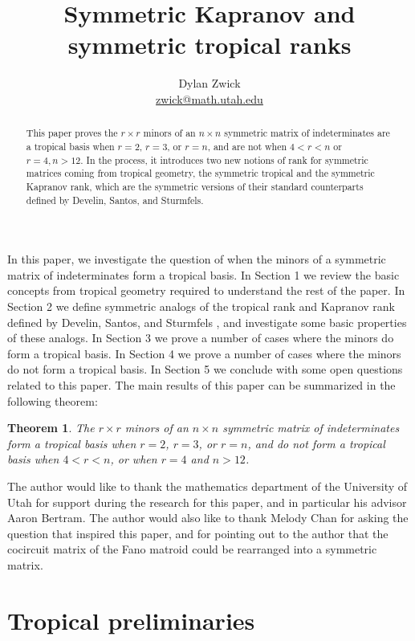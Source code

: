 \documentclass{article}
\title{Symmetric Kapranov and symmetric tropical ranks}
\author{Dylan Zwick \\ \href{mailto:zwick@math.utah.edu}{zwick@math.utah.edu}}
\date{}
\begin{document}
\maketitle

\begin{abstract} 
  This paper proves the $r \times r$ minors of an $n \times n$ symmetric matrix of indeterminates are a tropical basis when $r = 2$, $r = 3$, or $r = n$, and are not when $4 < r < n$ or $r = 4, n > 12$. In the process, it introduces two new notions of rank for symmetric matrices coming from tropical geometry, the symmetric tropical and the symmetric Kapranov rank, which are the symmetric versions of their standard counterparts defined by Develin, Santos, and Sturmfels.
\end{abstract}

In this paper, we investigate the question of when the minors of a symmetric matrix of indeterminates form a tropical basis. In Section 1 we review the basic concepts from tropical geometry required to understand the rest of the paper. In Section 2 we define symmetric analogs of the tropical rank and Kapranov rank defined by Develin, Santos, and Sturmfels \cite{dss}, and investigate some basic properties of these analogs. In Section 3 we prove a number of cases where the minors do form a tropical basis. In Section 4 we prove a number of cases where the minors do not form a tropical basis. In Section 5 we conclude with some open questions related to this paper. The main results of this paper can be summarized in the following theorem:

\newtheorem{thm}{Theorem}
\begin{thm}
  The $r \times r$ minors of an $n \times n$ symmetric matrix of indeterminates form a tropical basis when $r = 2$, $r = 3$, or $r = n$, and do not form a tropical basis when $4 < r < n$, or when $r = 4$ and $n > 12$.
\end{thm}

The author would like to thank the mathematics department of the University of Utah for support during the research for this paper, and in particular his advisor Aaron Bertram. The author would also like to thank Melody Chan for asking the question that inspired this paper, and for pointing out to the author that the cocircuit matrix of the Fano matroid could be rearranged into a symmetric matrix.

\section{Tropical preliminaries}
\end{document}
